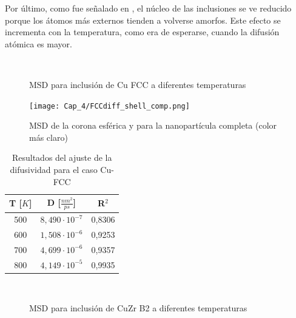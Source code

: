 Por último, como fue señalado en \cite{albe13}, el núcleo de las inclusiones se ve reducido porque los átomos más externos tienden a volverse amorfos. Este efecto se incrementa con la temperatura, como era de esperarse, cuando la difusión atómica es mayor.

\begin{figure}[htp]
\centering
{}
\\
\caption[MSD para inclusión de Cu FCC a diferentes temperaturas]{MSD para inclusión de Cu FCC a diferentes temperaturas}
\label{C4:fg:msd_Cu_FCC}
\end{figure}

\begin{figure}[htp]
\centering
\texttt{[image: Cap\_4/FCCdiff\_shell\_comp.png]}
\caption[MSD de la corona esférica y la nanopartícula completa]{MSD de la corona esférica y para la nanopartícula completa (color más claro)}
\label{C4:fg:FCCdiff_shell_comp}
\end{figure}

\begin{table}[htp]
\caption{Resultados del ajuste de la difusividad para el caso Cu-FCC}
\begin{center}
\begin{tabular}{*{3}{c}}
\hline
T [$K$] & D [$\frac{nm^{2}}{ps}$] & R$^{2}$ \\
\hline \hline
500 & $8,490\cdot 10^{-7}$ & 0,8306 \\
\hline
600 & $1,508\cdot 10^{-6}$ & 0,9253 \\
\hline
700 & $4,699\cdot 10^{-6}$ & 0,9357 \\
\hline
800 & $4,149\cdot 10^{-5}$ & 0,9935 \\
\hline
\end{tabular}
\end{center}
\label{C4:tb:FCC_Diff_Fit_Restults}
\end{table}

\begin{figure}[htp]
\centering
{}
\\
\caption[MSD para inclusión de CuZr B2 a diferentes temperaturas]{MSD para inclusión de CuZr B2 a diferentes temperaturas}
\label{C4:fg:msd_CuZr_B2}
\end{figure}

